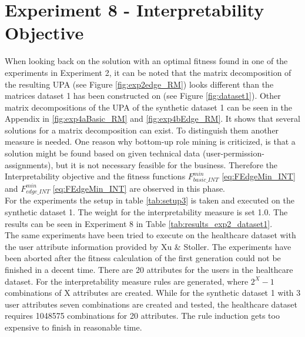 \newpage
\section{Experiment 8 - Interpretability Objective}
\label{sec:exp8}
When looking back on the solution with an optimal fitness found in one of the experiments in Experiment 2, it can be noted that the matrix decomposition of the resulting UPA (see Figure \ref{fig:exp2edge_RM}) looks different than the matrices dataset 1 has been constructed on (see Figure \ref{fig:dataset1}). Other matrix decompositions of the UPA of the synthetic dataset 1 can be seen in the Appendix in \ref{fig:exp4aBasic_RM} and \ref{fig:exp4bEdge_RM}. It shows that several solutions for a matrix decomposition can exist. To distinguish them another measure is needed. One reason why bottom-up role mining is criticized, is that a solution might be found based on given technical data (user-permission-assignments), but it is not necessary feasible for the business. Therefore the Interpretability objective and the fitness functions
$F_{basic\_INT}^{min}$ \eqref{eq:FEdgeMin_INT} and $F_{edge\_INT}^{min}$ \eqref{eq:FEdgeMin_INT} are observed in this phase.\\
For the experiments the setup in table \ref{tab:setup3} is taken and executed on the synthetic dataset 1. The weight for the interpretability measure is set 1.0. The results can be seen in Experiment 8 in Table \ref{tab:results_exp2_dataset1}.\\
The same experiments have been tried to execute on the healthcare dataset with the user attribute information provided by Xu \& Stoller\cite{Xu}. The experiments have been aborted after the fitness calculation of the first generation could not be finished in a decent time. There are 20 attributes for the users in the healthcare dataset. For the interpretability measure rules are generated, where $2^X-1$ combinations of X attributes are created. While for the synthetic dataset 1 with 3 user attributes seven combinations are created and tested, the healthcare dataset requires 1048575 combinations for 20 attributes. The rule induction gets too expensive to finish in reasonable time.